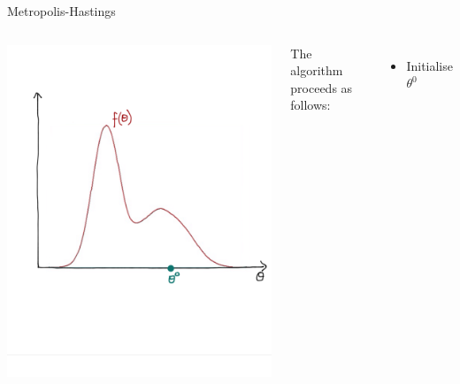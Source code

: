\documentclass[compress]{beamer}
\begin{document}
\begin{frame}[label=sec-7-2]{Metropolis-Hastings}
\begin{columns}[c] 
\includegraphics[width=0.8\linewidth]{MH1}

The algorithm proceeds as follows:\\
\begin{itemize}
\item Initialise $\theta^{0}$
\end{itemize}
\end{columns}
\end{frame}
\end{document}
